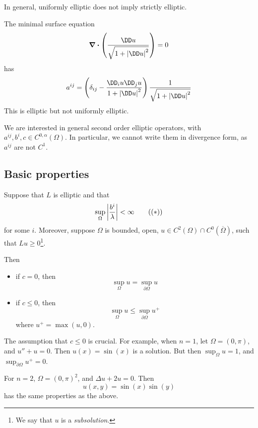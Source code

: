 \documentclass{article}
\begin{document}
\begin{remark}
    In general, uniformly elliptic does not imply strictly elliptic.
\end{remark}

\begin{example}
    The minimal surface equation
    \[\grad\vdot\left(\frac{\DD u}{\sqrt{1 + \abs{\DD u}^2}}\right) = 0\]
    has
    \[a^{ij} = \left(\delta_{ij} - \frac{\DD_i u \DD_j u}{1+ \abs{\DD u}^2}\right)\frac{1}{\sqrt{1 + \abs{\DD u}^2}}\]
    This is elliptic but not uniformly elliptic.
\end{example}

\lec

We are interested in general second order elliptic operators, with \(a^{ij}, b^i, c \in C^{0, \alpha}(\Omega)\). In particular, we cannot write them in divergence form, as \(a^{ij}\) are not \(C^1\).

\subsection{Basic properties}

\begin{theorem}
     Suppose that \(L\) is elliptic and that
    \[\sup_\Omega \abs{\frac{b^i}{\lambda}} < \infty \tag{\((*)\)}\]
    for some \(i\). Moreover, suppose \(\Omega\) is bounded, open, \(u \in C^2(\Omega) \cap C^0(\overline\Omega)\), such that \(Lu \ge 0\)\footnote{We say that \(u\) is a \emph{subsolution}.}.

    Then
    \begin{itemize}
        \item if \(c = 0\), then
        \[\sup_\Omega u = \sup_{\partial\Omega} u\]
        \item if \(c \le 0\), then
        \[\sup_\Omega u \le \sup_{\partial\Omega}u^+\]
        where \(u^+ = \max(u, 0)\).
    \end{itemize}
\end{theorem}

\begin{remark}
    The assumption that \(c \le 0\) is crucial. For example, when \(n = 1\), let \(\Omega = (0, \pi)\), and \(u'' + u = 0\). Then \(u(x) = \sin(x)\) is a solution. But then \(\sup_\Omega u = 1\), and \(\sup_{\partial\Omega}u^+ = 0\).

    For \(n = 2\), \(\Omega = (0, \pi)^2\), and \(\Delta u + 2u = 0\). Then
    \[u(x, y) = \sin(x)\sin(y)\]
    has the same properties as the above.
\end{remark}
\end{document}
